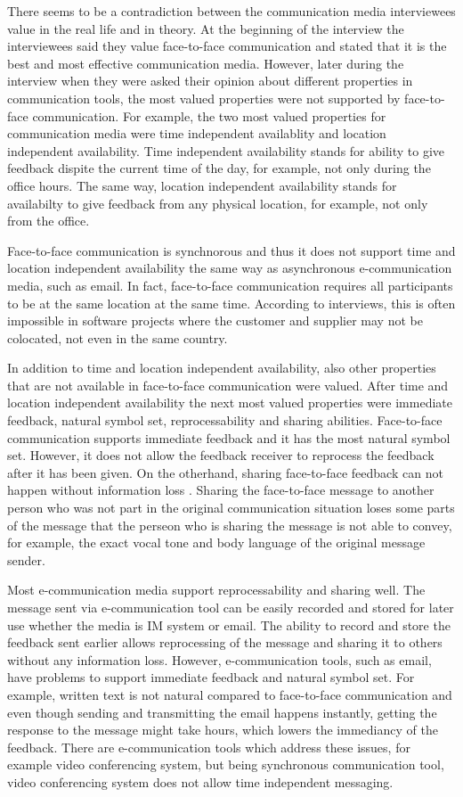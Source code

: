 \documentclass[english,12pt,a4paper,pdftex]{article}
\begin{document}
There seems to be a contradiction between the communication media interviewees value in the real life and in theory. At the beginning of the interview the interviewees said they value face-to-face communication and stated that it is the best and most effective communication media. However, later during the interview when they were asked their opinion about different properties in communication tools, the most valued properties were not supported by face-to-face communication. For example, the two most valued properties for communication media were time independent availablity and location independent availability. Time independent availability stands for ability to give feedback dispite the current time of the day, for example, not only during the office hours. The same way, location independent availability stands for availabilty to give feedback from any physical location, for example, not only from the office.

Face-to-face communication is synchnorous and thus it does not support time and location independent availability the same way as asynchronous e-communication media, such as email. In fact, face-to-face communication requires all participants to be at the same location at the same time. According to interviews, this is often impossible in software projects where the customer and supplier may not be colocated, not even in the same country.

In addition to time and location independent availability, also other properties that are not available in face-to-face communication were valued. After time and location independent availability the next most valued properties were immediate feedback, natural symbol set, reprocessability and sharing abilities. Face-to-face communication supports immediate feedback and it has the most natural symbol set. However, it does not allow the feedback receiver to reprocess the feedback after it has been given. On the otherhand, sharing face-to-face feedback can not happen without information loss \citep{higa2007}. Sharing the face-to-face message to another person who was not part in the original communication situation loses some parts of the message that the perseon who is sharing the message is not able to convey, for example, the exact vocal tone and body language of the original message sender.

Most e-communication media support reprocessability and sharing well. The message sent via e-communication tool can be easily recorded and stored for later use whether the media is \ac{IM} system or email. The ability to record and store the feedback sent earlier allows reprocessing of the message and sharing it to others without any information loss. However, e-communication tools, such as email, have problems to support immediate feedback and natural symbol set. For example, written text is not natural compared to face-to-face communication and even though sending and transmitting the email happens instantly, getting the response to the message might take hours, which lowers the immediancy of the feedback. There are e-communication tools which address these issues, for example video conferencing system, but being synchronous communication tool, video conferencing system does not allow time independent messaging.
\end{document}
